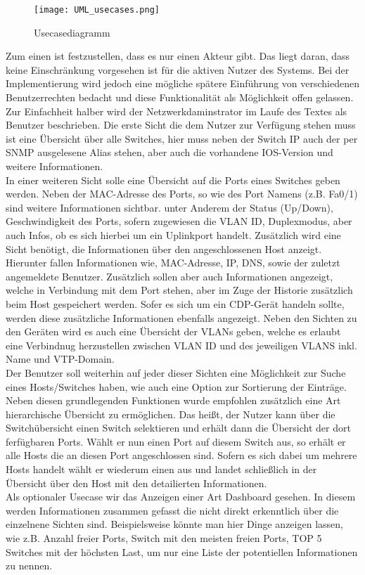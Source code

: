 \begin{figure}[H]
\centering
\texttt{[image: UML\_usecases.png]}
\caption{Usecasediagramm}
\label{fig:usecase001}
\end{figure}

Zum einen ist festzustellen, dass es nur einen Akteur gibt. Das liegt daran, dass keine Einschränkung vorgesehen ist für die aktiven Nutzer des Systems. Bei der Implementierung wird jedoch eine mögliche spätere Einführung von verschiedenen Benutzerrechten bedacht und diese Funktionalität als Möglichkeit offen gelassen. Zur Einfachheit halber wird der Netzwerkdaminstrator im Laufe des Textes als Benutzer beschrieben.
Die erste Sicht die dem Nutzer zur Verfügung stehen muss ist eine Übersicht über alle Switches, hier muss neben der Switch IP auch der per SNMP ausgelesene Alias stehen, aber auch die vorhandene IOS-Version und weitere Informationen.\\
In einer weiteren Sicht solle eine Übersicht auf die Ports eines Switches geben werden.
Neben der MAC-Adresse des Ports, so wie des Port Namens (z.B. Fa0/1) sind weitere Informationen sichtbar. unter Anderem der Status (Up/Down), Geschwindigkeit des Ports, sofern zugewiesen die VLAN ID, Duplexmodus, aber auch Infos, ob es sich hierbei um ein Uplinkport handelt.
Zusätzlich wird eine Sicht benötigt, die Informationen über den angeschlossenen Host anzeigt. Hierunter fallen Informationen wie, MAC-Adresse, IP, DNS, sowie der zuletzt angemeldete Benutzer. Zusätzlich sollen aber auch Informationen angezeigt, welche in Verbindung mit dem Port stehen, aber im Zuge der Historie zusätzlich beim Host gespeichert werden. Sofer es sich um ein CDP-Gerät handeln sollte, werden diese zusätzliche Informationen ebenfalls angezeigt.
Neben den Sichten zu den Geräten wird es auch eine Übersicht der VLANs geben, welche es erlaubt eine Verbindnug herzustellen zwischen VLAN ID und des jeweiligen VLANS inkl. Name und  VTP-Domain.\\
Der Benutzer soll weiterhin auf jeder dieser Sichten eine Möglichkeit zur Suche eines Hosts/Switches haben, wie auch eine Option zur Sortierung der Einträge.
Neben diesen grundlegenden Funktionen wurde empfohlen zusätzlich eine Art hierarchische Übersicht zu ermöglichen. Das heißt, der Nutzer kann über die Switchübersicht einen Switch selektieren und erhält dann die Übersicht der dort ferfügbaren Ports. Wählt er nun einen Port auf diesem Switch aus, so erhält er alle Hosts die an diesen Port angeschlossen sind. Sofern es sich dabei um mehrere Hosts handelt wählt er wiederum einen aus und landet schließlich in der Übersicht über den Host mit den detailierten Informationen.\\
Als optionaler Usecase wir das Anzeigen einer Art Dashboard gesehen. In diesem werden Informationen zusammen gefasst die nicht direkt erkenntlich über die einzelnene Sichten sind. Beispielsweise könnte man hier Dinge anzeigen lassen, wie z.B. Anzahl freier Ports, Switch mit den meisten freien Ports, TOP 5 Switches mit der höchsten Last, um nur eine Liste der potentiellen Informationen zu nennen.

